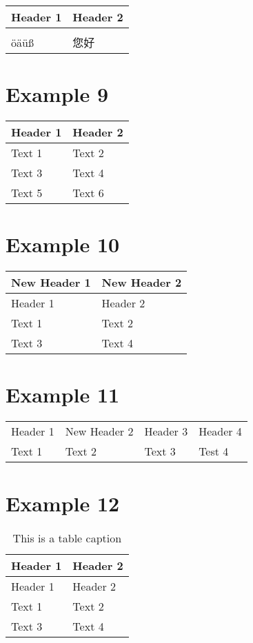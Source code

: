 \begin{longtable}[c]{@{}ll@{}}
\toprule
Header 1 & Header 2\tabularnewline
\midrule
\endhead
&\tabularnewline
öäüß & 您好\tabularnewline
\bottomrule
\end{longtable}

\section{Example 9}\label{example-9}

\begin{longtable}[c]{@{}ll@{}}
\toprule
Header 1 & Header 2\tabularnewline
\midrule
\endhead
Text 1 & Text 2\tabularnewline
Text 3 & Text 4\tabularnewline
Text 5 & Text 6\tabularnewline
\bottomrule
\end{longtable}

\section{Example 10}\label{example-10}

\begin{longtable}[c]{@{}ll@{}}
\toprule
New Header 1 & New Header 2\tabularnewline
\midrule
\endhead
Header 1 & Header 2\tabularnewline
Text 1 & Text 2\tabularnewline
Text 3 & Text 4\tabularnewline
\bottomrule
\end{longtable}

\section{Example 11}\label{example-11}

\begin{longtable}[c]{@{}llll@{}}
\toprule
Header 1 & New Header 2 & Header 3 & Header 4\tabularnewline
Text 1 & Text 2 & Text 3 & Test 4\tabularnewline
\bottomrule
\end{longtable}

\section{Example 12}\label{example-12}

\begin{longtable}[c]{@{}ll@{}}
\caption{This is a table caption}\tabularnewline
\toprule
Header 1 & Header 2\tabularnewline
\midrule
\endfirsthead
\toprule
Header 1 & Header 2\tabularnewline
\midrule
\endhead
Text 1 & Text 2\tabularnewline
Text 3 & Text 4\tabularnewline
\bottomrule
\end{longtable}

